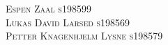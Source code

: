 
\vfill %


{\centering \large 
\hfill \textsc{Espen Zaal s198599} \\
\hfill \textsc{Lukas David Larsed s198569} \\
\hfill \textsc{Petter Knagenhjelm Lysne s198579} \\



\HRule{1pt}} %


\clearpage %